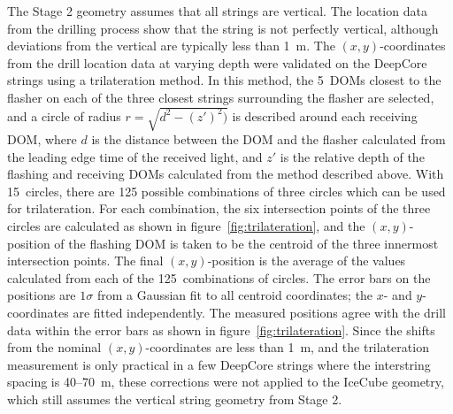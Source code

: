 The Stage 2 geometry assumes that all strings are vertical. The
location data from the drilling process show that the string is not perfectly vertical,
although deviations from the vertical are typically less than 1~m. The
$(x,y)$-coordinates from the drill location data at varying depth were validated on the DeepCore strings
using a trilateration method. In this method, the 5~DOMs closest to the
flasher on each of the three closest strings surrounding the flasher are
selected, and a circle of radius $r = \sqrt{d^2 - (z')^2)}$ is
described around each receiving DOM, where $d$ is the distance between the DOM
and the flasher calculated from the leading edge time of the received
light, and $z'$ is the relative depth of the flashing and receiving
DOMs calculated from the method described above. With 15~circles,
there are 125 possible combinations of three circles which can be used
for trilateration. For each combination, the six intersection points
of the three circles are calculated as shown in
figure~\ref{fig:trilateration}, and the $(x,y)$-position of the flashing DOM 
is taken to be the centroid of the three innermost intersection
points. The final $(x,y)$-position is the average of the values
calculated from each of the 125~combinations of circles. The
error bars on the positions are $1 \sigma$ from a Gaussian fit to all centroid
coordinates; the $x$- and $y$-coordinates are fitted independently. The
measured positions agree with the drill data within the error bars as shown in
figure~\ref{fig:trilateration}. Since the shifts from the nominal
$(x,y)$-coordinates are less than 1~m, and the trilateration measurement is only
practical in a few DeepCore strings where the interstring spacing is 40--70~m, these
corrections were not applied to the IceCube geometry, which still assumes
the vertical string geometry from Stage 2.


